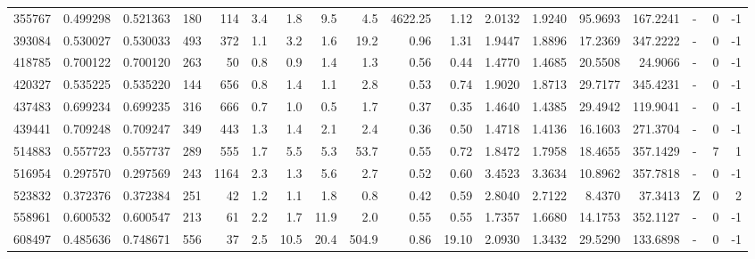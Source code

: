 \begin{tabular}{rrrrrrrrrrrrrrrlrr}
    355767 & 0.499298 &   0.521363 &  180 &  114 &      3.4 &      1.8 &     9.5 &      4.5 &    4622.25 &        1.12 &  2.0132 &  1.9240 &   95.9693 &  167.2241 &             - &        0 &         -1 \\
    393084 & 0.530027 &   0.530033 &  493 &  372 &      1.1 &      3.2 &     1.6 &     19.2 &       0.96 &        1.31 &  1.9447 &  1.8896 &   17.2369 &  347.2222 &             - &        0 &         -1 \\
    418785 & 0.700122 &   0.700120 &  263 &   50 &      0.8 &      0.9 &     1.4 &      1.3 &       0.56 &        0.44 &  1.4770 &  1.4685 &   20.5508 &   24.9066 &             - &        0 &         -1 \\
    420327 & 0.535225 &   0.535220 &  144 &  656 &      0.8 &      1.4 &     1.1 &      2.8 &       0.53 &        0.74 &  1.9020 &  1.8713 &   29.7177 &  345.4231 &             - &        0 &         -1 \\
    437483 & 0.699234 &   0.699235 &  316 &  666 &      0.7 &      1.0 &     0.5 &      1.7 &       0.37 &        0.35 &  1.4640 &  1.4385 &   29.4942 &  119.9041 &             - &        0 &         -1 \\
    439441 & 0.709248 &   0.709247 &  349 &  443 &      1.3 &      1.4 &     2.1 &      2.4 &       0.36 &        0.50 &  1.4718 &  1.4136 &   16.1603 &  271.3704 &             - &        0 &         -1 \\
    514883 & 0.557723 &   0.557737 &  289 &  555 &      1.7 &      5.5 &     5.3 &     53.7 &       0.55 &        0.72 &  1.8472 &  1.7958 &   18.4655 &  357.1429 &             - &        7 &          1 \\
    516954 & 0.297570 &   0.297569 &  243 & 1164 &      2.3 &      1.3 &     5.6 &      2.7 &       0.52 &        0.60 &  3.4523 &  3.3634 &   10.8962 &  357.7818 &             - &        0 &         -1 \\
    523832 & 0.372376 &   0.372384 &  251 &   42 &      1.2 &      1.1 &     1.8 &      0.8 &       0.42 &        0.59 &  2.8040 &  2.7122 &    8.4370 &   37.3413 &             Z &        0 &          2 \\
    558961 & 0.600532 &   0.600547 &  213 &   61 &      2.2 &      1.7 &    11.9 &      2.0 &       0.55 &        0.55 &  1.7357 &  1.6680 &   14.1753 &  352.1127 &             - &        0 &         -1 \\
    608497 & 0.485636 &   0.748671 &  556 &   37 &      2.5 &     10.5 &    20.4 &    504.9 &       0.86 &       19.10 &  2.0930 &  1.3432 &   29.5290 &  133.6898 &             - &        0 &         -1 \\

\end{tabular}
